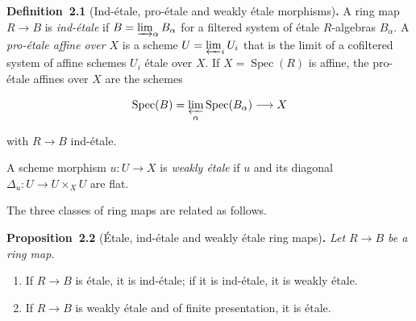 \documentclass[11pt]{article}
\newenvironment{bpstatement}[2]{\par\addvspace{0.6\baselineskip}\noindent\textbf{#1}#2\textbf{.}\enspace\ignorespaces}
  {\par\addvspace{0.4\baselineskip}}
\newenvironment{bpstatementit}[2]{\begin{bpstatement}{#1}{#2}\itshape\ignorespaces}{\end{bpstatement}}
\begin{document}
\label{bp7}%
\begin{bpstatement}{Definition~2.1}{ (Ind-étale, pro-étale and weakly étale morphisms)}
A ring map \(R\to B\) is \emph{ind-étale} if \(B=\varinjlim_\alpha B_\alpha\) for a filtered system of étale \(R\)-algebras \(B_\alpha\). A \emph{pro-étale affine over \(X\)} is a scheme \(U=\varprojlim_iU_i\) that is the limit of a cofiltered system of affine schemes \(U_i\) étale over \(X\). If \(X=\operatorname{Spec}(R)\) is affine, the pro-étale affines over \(X\) are the schemes

\[
\operatorname{Spec}(B)=\varprojlim_\alpha
\operatorname{Spec}(B_\alpha)\longrightarrow X
\]

with \(R\to B\) ind-étale.

A scheme morphism \(u:U\to X\) is \emph{weakly étale} if \(u\) and its diagonal \(\Delta_u:U\to U\times_XU\) are flat.
\end{bpstatement}

\label{bp8}%
The three classes of ring maps are related as follows.

\label{bp9}%
\begin{bpstatementit}{Proposition~2.2}{ (Étale, ind-étale and weakly étale ring maps)}
Let \(R\to B\) be a ring map.

\begin{enumerate}
\item If \(R\to B\) is étale, it is ind-étale; if it is ind-étale, it is weakly étale.
\item If \(R\to B\) is weakly étale and of finite presentation, it is étale.
\end{enumerate}
\end{bpstatementit}
\end{document}
